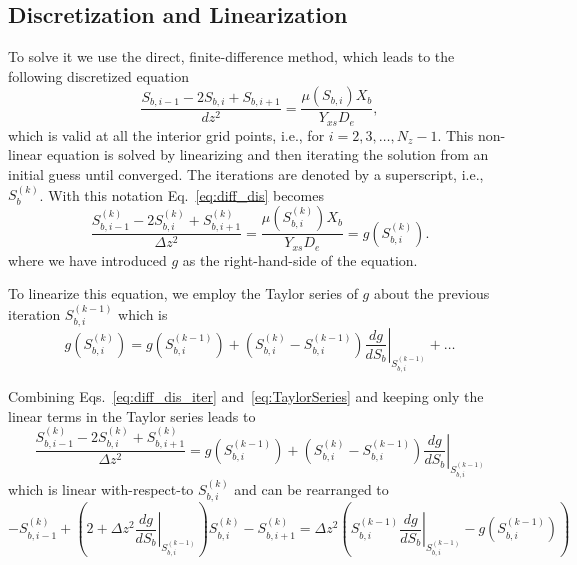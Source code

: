 \documentclass[letterpaper, twoside]{article}
\numberwithin{equation}{section}
\newcommand{\ie}{i.e.}
\begin{document}
\subsection{Discretization and Linearization}
To solve it we use the direct, finite-difference method, which leads to the following discretized equation
\begin{equation} \label{eq:diff_dis}
  \frac{ S_{b,i-1} - 2 S_{b,i} + S_{b,i+1}}{dz^2} = \frac{\mu(S_{b,i}) X_b}{Y_{xs} D_e},
\end{equation}
which is valid at all the interior grid points, \ie, for $i=2,3,\dots,N_z-1$. 
This non-linear equation is solved by linearizing and then iterating the solution from an initial guess until converged.
The iterations are denoted by a superscript, \ie, $S_{b}^{(k)}$.  With this notation Eq.~\ref{eq:diff_dis} becomes
\begin{equation} \label{eq:diff_dis_iter}
  \frac{ S_{b,i-1}^{(k)} - 2 S_{b,i}^{(k)} + S_{b,i+1}^{(k)}}{\Delta z^2} = \frac{\mu\left(S_{b,i}^{(k)}\right) X_b}{Y_{xs} D_e} =  g\left(S_{b,i}^{(k)}\right).
\end{equation}
where we have introduced $g$ as the right-hand-side of the equation.

To linearize this equation, we employ the Taylor series of $g$ about the previous iteration $S_{b,i}^{(k-1)}$ which is
\begin{equation}\label{eq:TaylorSeries}
  g\left(S_{b,i}^{(k)}\right) =   g\left(S_{b,i}^{(k-1)}\right) + \left( S_{b,i}^{(k)} - S_{b,i}^{(k-1)}\right) \left.\frac{d g}{d S_b}\right|_{S_{b,i}^{(k-1)}} + \dots
\end{equation}

Combining Eqs.~\ref{eq:diff_dis_iter} and~\ref{eq:TaylorSeries} and keeping only the linear terms in the Taylor series leads to
\begin{equation} \label{eq:diff_linear}
  \frac{ S_{b,i-1}^{(k)} - 2 S_{b,i}^{(k)} + S_{b,i+1}^{(k)}}{\Delta z^2} =  g\left(S_{b,i}^{(k-1)}\right) + \left( S_{b,i}^{(k)} - S_{b,i}^{(k-1)}\right) \left.\frac{d g}{d S_b}\right|_{S_{b,i}^{(k-1)}} 
\end{equation}
which is linear with-respect-to $S_{b,i}^{(k)}$ and can be rearranged to
\begin{equation}
  \label{eq:diff_final}
  -S_{b,i-1}^{(k)} + \left( 2 +\Delta z^2\left.\frac{d g}{d S_b}\right|_{S_{b,i}^{(k-1)}}\right) S_{b,i}^{(k)} - S_{b,i+1}^{(k)}
  = \Delta z^2\left( S_{b,i}^{(k-1)} \left.\frac{d g}{d S_b}\right|_{S_{b,i}^{(k-1)}} - g\left(S_{b,i}^{(k-1)}\right)\right) 
\end{equation}
\end{document}
